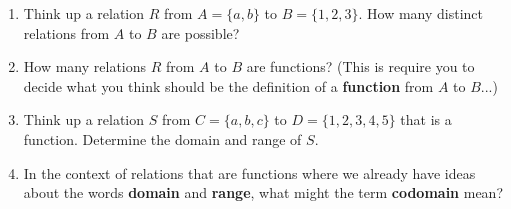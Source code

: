 \documentclass[12pt]{article}
\renewcommand{\emph}[1]{\textsf{\textbf{#1}}}
\begin{document}
\begin{enumerate}
\vfill	
\item Think up a relation $R$ from $A=\{a,b\}$ to $B=\{1,2,3\}$. How many distinct relations from $A$ to $B$ are possible?
\vfill
\item How many relations $R$ from $A$ to $B$ are functions? (This is require you to decide what you think should be the definition of a \emph{function} from $A$ to $B$...)
\vfill
\item Think up a relation $S$ from $C=\{a,b,c\}$ to $D=\{1,2,3,4,5\}$ that is a function. Determine the domain and range of $S$.
\vfill
\item In the context of relations that are functions where we already have ideas about the words \emph{domain} and \emph{range}, what might the term \emph{codomain} mean?
\vfill
\end{enumerate}
\end{document}

